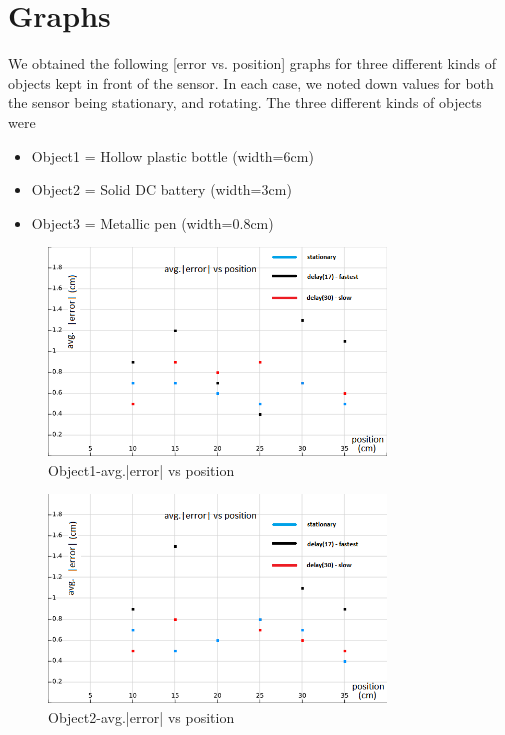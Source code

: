 \section{Graphs}
We obtained the following [error vs. position] graphs for three different kinds of objects kept in front of the sensor. In each case, we noted down values for both the sensor being stationary, and rotating. The three different kinds of objects were
\begin{itemize}
	\item Object1 = Hollow plastic bottle (width=6cm)
	\item Object2 = Solid DC battery (width=3cm)
	\item Object3 = Metallic pen (width=0.8cm)
\end{itemize}

\begin{figure}[H]
	\vfill
	\centering
	\includegraphics[width=0.8\textwidth]{../Files/save12}
	\caption{Object1-avg.|error| vs position} 
\end{figure}
\begin{figure}[H]
	\vfill
	\centering
	\includegraphics[width=0.8\textwidth]{../Files/save21}
	\caption{Object2-avg.|error| vs position} 
\end{figure}

